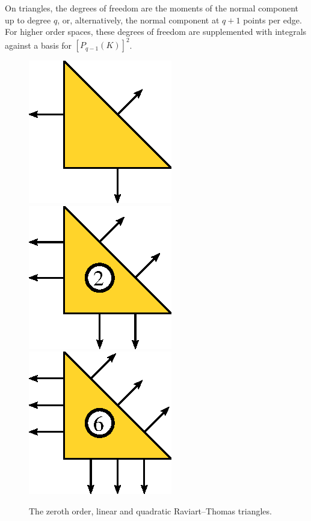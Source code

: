 On triangles, the degrees of freedom are the moments of the normal
component up to degree \( q \), or, alternatively, the normal
component at \( q + 1 \) points per edge. For higher order spaces,
these degrees of freedom are supplemented with integrals against a
basis for \( [P_{q-1}(K)]^2 \).

\begin{figure}[H]
  \begin{center}
    \includegraphics[width=\smallwidth]{chapters/kirby-6/eps/RT0.eps}
    \includegraphics[width=\smallwidth]{chapters/kirby-6/eps/RT1.eps}
    \includegraphics[width=\smallwidth]{chapters/kirby-6/eps/RT2.eps}
    \caption{The zeroth order, linear and quadratic Raviart--Thomas
      triangles.}
  \end{center}
\end{figure}

